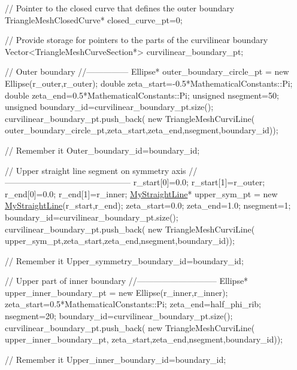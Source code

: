 \begin{DoxyCodeInclude}
 \textcolor{comment}{// Pointer to the closed curve that defines the outer boundary}
 TriangleMeshClosedCurve* closed\_curve\_pt=0;
 
 \textcolor{comment}{// Provide storage for pointers to the parts of the curvilinear boundary}
 Vector<TriangleMeshCurveSection*> curvilinear\_boundary\_pt;

 \textcolor{comment}{// Outer boundary}
 \textcolor{comment}{//---------------}
 Ellipse* outer\_boundary\_circle\_pt = \textcolor{keyword}{new} Ellipse(r\_outer,r\_outer);
 \textcolor{keywordtype}{double} zeta\_start=-0.5*MathematicalConstants::Pi;
 \textcolor{keywordtype}{double} zeta\_end=0.5*MathematicalConstants::Pi;
 \textcolor{keywordtype}{unsigned} nsegment=50;
 \textcolor{keywordtype}{unsigned} boundary\_id=curvilinear\_boundary\_pt.size();
 curvilinear\_boundary\_pt.push\_back(
  \textcolor{keyword}{new} TriangleMeshCurviLine(
   outer\_boundary\_circle\_pt,zeta\_start,zeta\_end,nsegment,boundary\_id));

 \textcolor{comment}{// Remember it}
 Outer\_boundary\_id=boundary\_id;
 

 \textcolor{comment}{// Upper straight line segment on symmetry axis}
 \textcolor{comment}{//---------------------------------------------}
 r\_start[0]=0.0;
 r\_start[1]=r\_outer;
 r\_end[0]=0.0;
 r\_end[1]=r\_inner;
 \hyperlink{classMyStraightLine}{MyStraightLine}* upper\_sym\_pt = \textcolor{keyword}{new} \hyperlink{classMyStraightLine}{MyStraightLine}(r\_start,r\_end);
 zeta\_start=0.0;
 zeta\_end=1.0;
 nsegment=1;
 boundary\_id=curvilinear\_boundary\_pt.size();
 curvilinear\_boundary\_pt.push\_back(
  \textcolor{keyword}{new} TriangleMeshCurviLine(
   upper\_sym\_pt,zeta\_start,zeta\_end,nsegment,boundary\_id));
                                                        
 \textcolor{comment}{// Remember it}
 Upper\_symmetry\_boundary\_id=boundary\_id;
 
 \textcolor{comment}{// Upper part of inner boundary}
 \textcolor{comment}{//-----------------------------}
 Ellipse* upper\_inner\_boundary\_pt = 
  \textcolor{keyword}{new} Ellipse(r\_inner,r\_inner);
 zeta\_start=0.5*MathematicalConstants::Pi;
 zeta\_end=half\_phi\_rib;
 nsegment=20;
 boundary\_id=curvilinear\_boundary\_pt.size();
 curvilinear\_boundary\_pt.push\_back(
  \textcolor{keyword}{new} TriangleMeshCurviLine(
   upper\_inner\_boundary\_pt,
   zeta\_start,zeta\_end,nsegment,boundary\_id));

 \textcolor{comment}{// Remember it}
 Upper\_inner\_boundary\_id=boundary\_id;


\end{DoxyCodeInclude}
